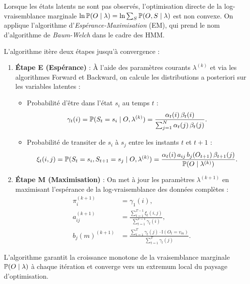 \begin{proposition}
    Lorsque les états latents ne sont pas observés, l'optimisation directe de la log-vraisemblance marginale $\ln \mathbb{P}(O \mid \lambda) = \ln \sum_S \mathbb{P}(O, S \mid \lambda)$ est non convexe. On applique l'algorithme d'\emph{Espérance-Maximisation} (EM), qui prend le nom d'algorithme de \emph{Baum-Welch} dans le cadre des HMM.

    L'algorithme itère deux étapes jusqu'à convergence :
    \begin{enumerate}
        \item \textbf{Étape E (Espérance)} : À l'aide des paramètres courants $\lambda^{(k)}$ et via les algorithmes Forward et Backward, on calcule les distributions a posteriori sur les variables latentes :
        \begin{itemize}
            \item Probabilité d'être dans l'état $s_i$ au temps $t$ :
            \begin{equation}
                \gamma_t(i) = \mathbb{P}(S_t = s_i \mid O, \lambda^{(k)}) = \frac{\alpha_t(i) \, \beta_t(i)}{\sum_{j=1}^N \alpha_t(j) \, \beta_t(j)}.
            \end{equation}
            \item Probabilité de transiter de $s_i$ à $s_j$ entre les instants $t$ et $t+1$ :
            \begin{equation}
                \xi_t(i, j) = \mathbb{P}(S_t = s_i, S_{t+1} = s_j \mid O, \lambda^{(k)}) = \frac{\alpha_t(i) \, a_{ij} \, b_j(O_{t+1}) \, \beta_{t+1}(j)}{\mathbb{P}(O \mid \lambda^{(k)})}.
            \end{equation}
        \end{itemize}

        \item \textbf{Étape M (Maximisation)} : On met à jour les paramètres $\lambda^{(k+1)}$ en maximisant l'espérance de la log-vraisemblance des données complètes :
        \begin{align}
            \pi_i^{(k+1)} &= \gamma_1(i), \\
            a_{ij}^{(k+1)} &= \frac{\sum_{t=1}^{T-1} \xi_t(i, j)}{\sum_{t=1}^{T-1} \gamma_t(i)}, \\
            b_j(m)^{(k+1)} &= \frac{\sum_{t=1}^T \gamma_t(j) \cdot \mathbb{I}(O_t = v_m)}{\sum_{t=1}^T \gamma_t(j)}.
        \end{align}
    \end{enumerate}
    L'algorithme garantit la croissance monotone de la vraisemblance marginale $\mathbb{P}(O \mid \lambda)$ à chaque itération et converge vers un extremum local du paysage d'optimisation.
\end{proposition}